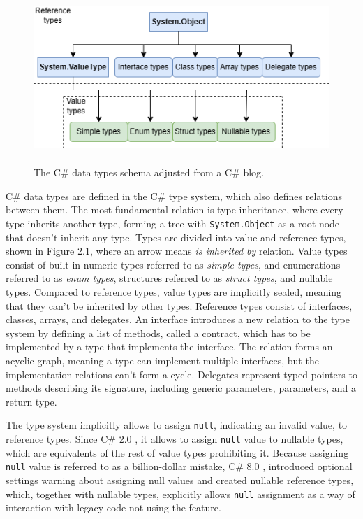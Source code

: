 \begin{figure}[b]
\centering
\includegraphics[width=140mm, height=65mm]{./img/CSTypeSystem.drawio.png}
\caption{The C\# data types schema adjusted from a C\# blog\cite{online:cSharpTypeSystem}.}
\label{img04:typeSys}
\end{figure}
C\# data types are defined in the C\# type system, which also defines relations between them. 
The most fundamental relation is type inheritance, where every type inherits another type, forming a tree with \texttt{System.Object} as a root node that doesn’t inherit any type.
Types are divided into value and reference types, shown in Figure 2.1, where an arrow means \textit{is inherited by} relation. 
Value types consist of built-in numeric types referred to as \textit{simple types}, and enumerations referred to as \textit{enum types}, structures referred to as \textit{struct types}, and nullable types. 
Compared to reference types, value types are implicitly sealed, meaning that they can’t be inherited by other types. 
Reference types consist of interfaces, classes, arrays, and delegates. 
An interface introduces a new relation to the type system by defining a list of methods, called a contract, which has to be implemented by a type that implements the interface.
The relation forms an acyclic graph, meaning a type can implement multiple interfaces, but the implementation relations can’t form a cycle. 
Delegates represent typed pointers to methods describing its signature, including generic parameters, parameters, and a return type.
\par
The type system implicitly allows to assign \texttt{null}, indicating an invalid value, to reference types. Since C\# 2.0 \cite{online:csHist}, it allows to assign \texttt{null} value to nullable types, which are equivalents of the rest of value types prohibiting it. Because assigning \texttt{null} value is referred to as a billion-dollar mistake, C\# 8.0 \cite{online:csHist}, introduced optional settings warning about assigning null values and created nullable reference types, which, together with nullable types, explicitly allows \texttt{null} assignment as a way of interaction with legacy code not using the feature.

